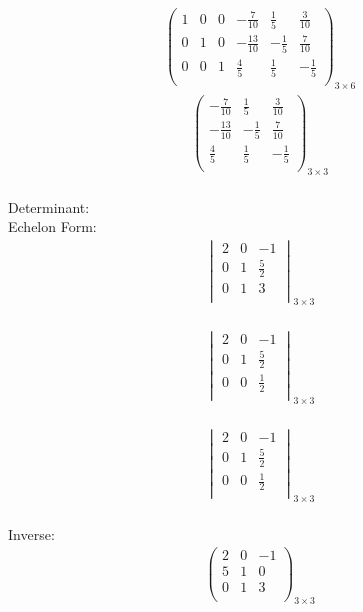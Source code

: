 \documentclass{article}
\begin{document}
\begin{align*}
\left(
\begin{array}{ccc|ccc}
1 & 0 & 0 & -\frac{7}{10} & \frac{1}{5} & \frac{3}{10}\\
0 & 1 & 0 & -\frac{13}{10} & -\frac{1}{5} & \frac{7}{10}\\
0 & 0 & 1 & \frac{4}{5} & \frac{1}{5} & -\frac{1}{5}\\
\end{array}
\right)_{3\times 6}
\end{align*}
\begin{align*}
\begin{pmatrix}
-\frac{7}{10} & \frac{1}{5} & \frac{3}{10}\\
-\frac{13}{10} & -\frac{1}{5} & \frac{7}{10}\\
\frac{4}{5} & \frac{1}{5} & -\frac{1}{5}\\
\end{pmatrix}_{3\times 3}
\end{align*}
\\
Determinant:\\
Echelon Form:\\
\begin{align*}
\begin{vmatrix}
2 & 0 & -1\\
0 & 1 & \frac{5}{2}\\
0 & 1 & 3\\
\end{vmatrix}_{3\times 3}
\end{align*}
\\
\begin{align*}
\begin{vmatrix}
2 & 0 & -1\\
0 & 1 & \frac{5}{2}\\
0 & 0 & \frac{1}{2}\\
\end{vmatrix}_{3\times 3}
\end{align*}
\\
\begin{align*}
\begin{vmatrix}
2 & 0 & -1\\
0 & 1 & \frac{5}{2}\\
0 & 0 & \frac{1}{2}\\
\end{vmatrix}_{3\times 3}
\end{align*}
\\
Inverse:\\
\begin{align*}
\begin{pmatrix}
2 & 0 & -1\\
5 & 1 & 0\\
0 & 1 & 3\\
\end{pmatrix}_{3\times 3}
\end{align*}
\end{document}
